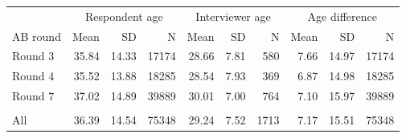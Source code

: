 
\begin{tabular}{lrrrrrrrrr}
\toprule
\multicolumn{1}{c}{ } & \multicolumn{3}{c}{Respondent age} & \multicolumn{3}{c}{Interviewer age} & \multicolumn{3}{c}{Age difference} \\
\cmidrule(l{3pt}r{3pt}){2-4} \cmidrule(l{3pt}r{3pt}){5-7} \cmidrule(l{3pt}r{3pt}){8-10}
AB round & Mean & SD & N & Mean & SD & N & Mean & SD & N\\
\midrule
Round 3 & 35.84 & 14.33 & 17174 & 28.66 & 7.81 & 580 & 7.66 & 14.97 & 17174\\
Round 4 & 35.52 & 13.88 & 18285 & 28.54 & 7.93 & 369 & 6.87 & 14.98 & 18285\\
Round 7 & 37.02 & 14.89 & 39889 & 30.01 & 7.00 & 764 & 7.10 & 15.97 & 39889\\
\cline{2-10} \\[-5pt]
All & 36.39 & 14.54 & 75348 & 29.24 & 7.52 & 1713 & 7.17 & 15.51 & 75348\\
\bottomrule
\end{tabular}
